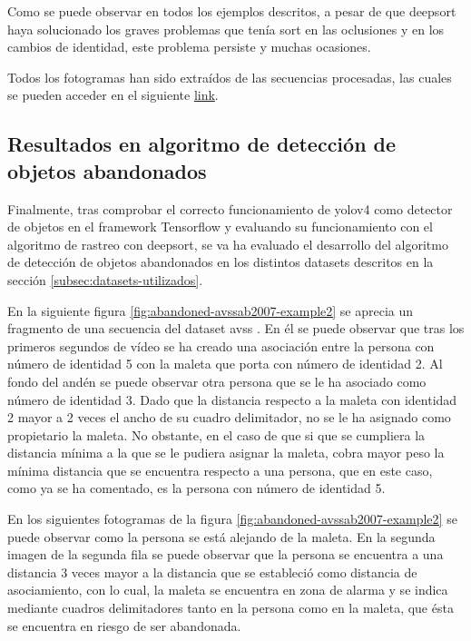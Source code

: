 Como se puede observar en todos los ejemplos descritos, a pesar de que \gls{deepsort} haya solucionado los graves problemas que tenía \gls{sort} en las oclusiones y en los cambios de identidad, este problema persiste y muchas ocasiones.

Todos los fotogramas han sido extraídos de las secuencias procesadas, las cuales se pueden acceder en el siguiente \href{https://drive.google.com/drive/folders/1MIfUcVmwIot6QgV0VRRu5PdFscV1Ma48?usp=sharing}{link}.

\subsection{Resultados en algoritmo de detección de objetos abandonados}
\label{subsec:resultados-abandon-algorithm}

Finalmente, tras comprobar el correcto funcionamiento de \gls{yolov4} como detector de objetos en el framework Tensorflow y evaluando su funcionamiento con el algoritmo de rastreo con \gls{deepsort}, se va ha evaluado el desarrollo del algoritmo de detección de objetos abandonados en los distintos datasets descritos en la sección \ref{subsec:datasets-utilizados}.

En la siguiente figura \ref{fig:abandoned-avssab2007-example2} se aprecia un fragmento de una secuencia del dataset \gls{avss} \cite{AVSSAB2007-dataset}. En él se puede observar que tras los primeros segundos de vídeo se ha creado una asociación entre la persona con número de identidad 5 con la maleta que porta con número de identidad 2. Al fondo del andén se puede observar otra persona que se le ha asociado como número de identidad 3. Dado que la distancia respecto a la maleta con identidad 2 mayor a 2 veces el ancho de su cuadro delimitador, no se le ha asignado como propietario la maleta. No obstante, en el caso de que si que se cumpliera la distancia mínima a la que se le pudiera asignar la maleta, cobra mayor peso la mínima distancia que se encuentra respecto a una persona, que en este caso, como ya se ha comentado, es la persona con número de identidad 5.

En los siguientes fotogramas de la figura \ref{fig:abandoned-avssab2007-example2} se puede observar como la persona se está alejando de la maleta. En la segunda imagen de la segunda fila se puede observar que la persona se encuentra a una distancia 3 veces mayor a la distancia que se estableció como distancia de asociamiento, con lo cual, la maleta se encuentra en zona de alarma y se indica mediante cuadros delimitadores tanto en la persona como en la maleta, que ésta se encuentra en riesgo de ser abandonada.

